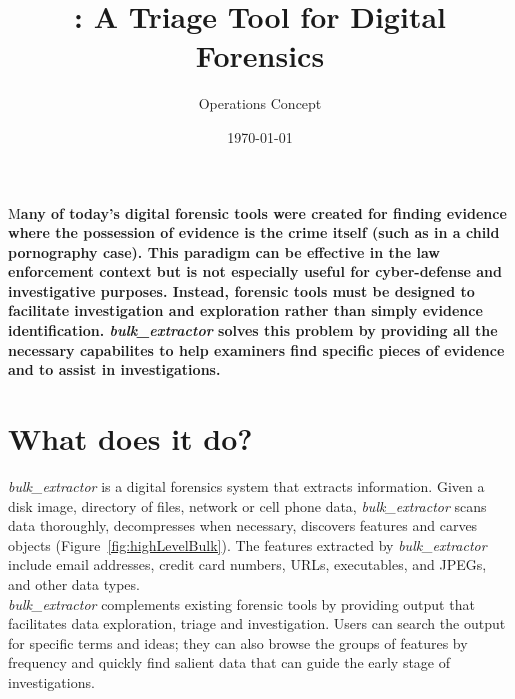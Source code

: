 \documentclass[DIV=calc, paper=a4, fontsize=11pt]{article}	 %
\title{\bulk: A Triage Tool for Digital Forensics} %
\author{Operations Concept} %
\date{\today} %
\newcommand \bulk {\textit{bulk\_extractor}\xspace}
\newcommand{\initial}[1]{ %
\lettrine[lines=3,lhang=0.3,nindent=0em]{
\color{LightBlue}
{\textsf{#1}}}{}}
\begin{document}
\maketitle %

\thispagestyle{fancy} %


\initial{M}\textbf{any of today's digital forensic tools were created for finding evidence where the possession of evidence is the  crime itself (such as in a child pornography case). This paradigm can be effective in the law enforcement context but is not especially useful for cyber-defense and investigative purposes. Instead, forensic tools must be designed to facilitate investigation and exploration rather than simply evidence identification\cite{Next10Years}. \bulk solves this problem by providing all the necessary capabilites to help examiners find specific pieces of evidence and to assist in investigations.}

\section*{What does it do?}
\bulk is a digital forensics system that extracts information. Given a disk image, directory of files, network or cell phone data, \bulk scans data thoroughly, decompresses when necessary, discovers features and carves objects (Figure~\ref{fig:highLevelBulk}). The features extracted by \bulk include email addresses, credit card numbers, URLs, executables, and JPEGs, and other data types.\\

\noindent
\bulk complements existing forensic tools  by providing output that facilitates data exploration, triage and investigation. Users can search the output for specific terms and ideas; they can also browse the groups of features by frequency and quickly find salient data that can guide the early stage of investigations.
\end{document}
